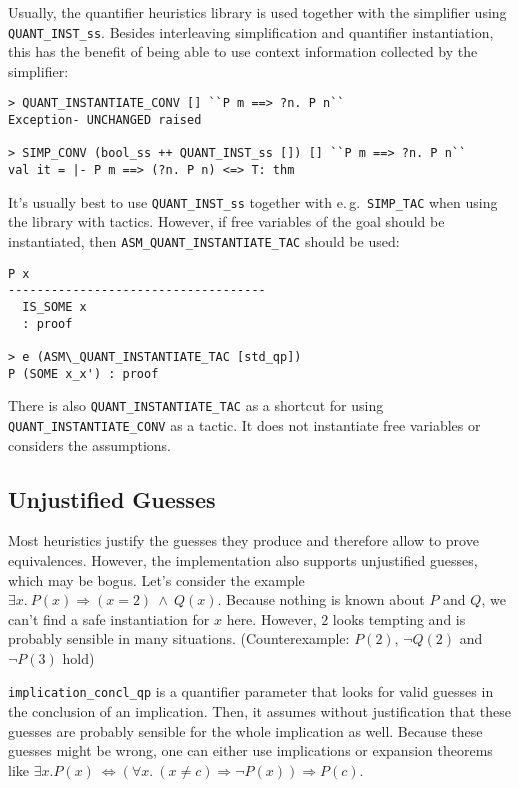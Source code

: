 \documentclass[a4paper,12pt,DIV=12,oneside]{scrbook}
\theoremstyle{definition}
\theoremstyle{remark}
\begin{document}
Usually, the quantifier heuristics library is used together with the
simplifier using \texttt{QUANT\_INST\_ss}. Besides interleaving
simplification and quantifier instantiation, this has the benefit of 
being able to use context information collected by the simplifier:

{\scriptsize
\begin{verbatim}
> QUANT_INSTANTIATE_CONV [] ``P m ==> ?n. P n``
Exception- UNCHANGED raised

> SIMP_CONV (bool_ss ++ QUANT_INST_ss []) [] ``P m ==> ?n. P n``
val it = |- P m ==> (?n. P n) <=> T: thm
\end{verbatim}}

It's usually best to use \texttt{QUANT\_INST\_ss}
together with e.\,g.\ \texttt{SIMP\_TAC} when using the library with tactics.
However, if free variables of the goal should be instantiated, then
\texttt{ASM\_QUANT\_INSTANTIATE\_TAC} should be used:

{\scriptsize
\begin{verbatim}
P x
------------------------------------
  IS_SOME x
  : proof

> e (ASM\_QUANT_INSTANTIATE_TAC [std_qp])
P (SOME x_x') : proof
\end{verbatim}}

There is also \texttt{QUANT\_INSTANTIATE\_TAC} as a shortcut
for using \texttt{QUANT\_INSTANTIATE\_CONV} as a tactic. It does not
instantiate free variables or considers the assumptions.


\subsection{Unjustified Guesses}

Most heuristics justify the guesses they produce and therefore allow to
prove equivalences.
However, the implementation also supports unjustified guesses, which may be bogus.
Let's consider the example $\exists x.\ P(x) \Longrightarrow (x = 2)\ \wedge\ Q(x)$.
Because nothing is known about $P$ and $Q$, we can't find a safe instantiation for $x$ here.
However, $2$ looks tempting and is probably sensible in many situations. (Counterexample:
$P(2)$, $\neg Q(2)$ and $\neg P(3)$ hold)

\texttt{implication\_concl\_qp} is a quantifier parameter that looks for valid guesses in the conclusion of an implication. 
Then, it assumes without justification that these guesses are probably sensible for the whole implication as well. 
Because these guesses might be wrong, one can either use implications or
expansion theorems like $\exists x. P(x)\ \Leftrightarrow (\forall x.\ (x \neq c) \Rightarrow \neg P(x)) \Rightarrow P(c)$.
\end{document}
